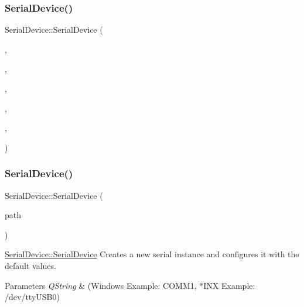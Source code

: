 \subsubsection{\texorpdfstring{Serial\+Device()}{SerialDevice()}\hspace{0.1cm}{\footnotesize\ttfamily [3/5]}}
{\footnotesize\ttfamily Serial\+Device\+::\+Serial\+Device (\begin{DoxyParamCaption}\item[{Q\+Serial\+Port\+Info}]{,  }\item[{int}]{,  }\item[{int}]{,  }\item[{int}]{,  }\item[{int}]{,  }\item[{int}]{ }\end{DoxyParamCaption})}

\hypertarget{class_serial_device_a070f0759c102570004f1c5e1feb31abe}{}\label{class_serial_device_a070f0759c102570004f1c5e1feb31abe} 
\subsubsection{\texorpdfstring{Serial\+Device()}{SerialDevice()}\hspace{0.1cm}{\footnotesize\ttfamily [4/5]}}
{\footnotesize\ttfamily Serial\+Device\+::\+Serial\+Device (\begin{DoxyParamCaption}\item[{Q\+String}]{path }\end{DoxyParamCaption})}



\hyperlink{class_serial_device_aad126bede3b0adf49e1fbe3afd7c6c42}{Serial\+Device\+::\+Serial\+Device} Creates a new serial instance and configures it with the default values. 


\begin{DoxyParams}{Parameters}
{\em Q\+String} & (Windows Example\+: C\+O\+M\+M1, $\ast$\+I\+NX Example\+: /dev/tty\+U\+S\+B0) \\
\hline
\end{DoxyParams}
\hypertarget{class_serial_device_ade7e1d81fe4768ca9f04b12513d7e316}{}\label{class_serial_device_ade7e1d81fe4768ca9f04b12513d7e316} 
